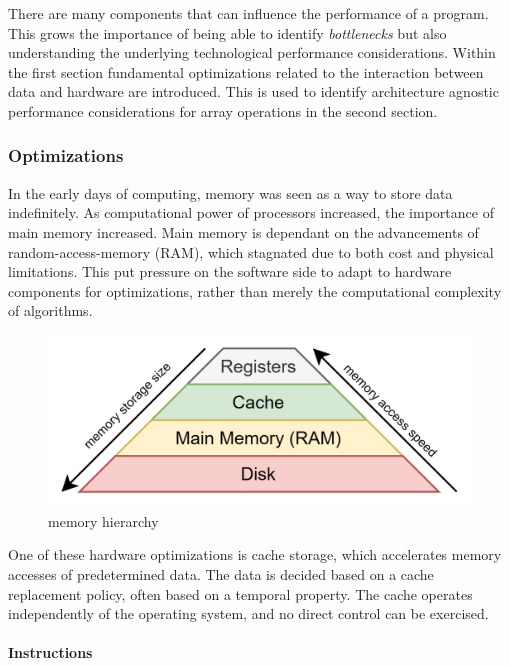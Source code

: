 \documentclass{article}
\begin{document}
There are many components that can influence the performance of a program.
This grows the importance of being able to identify {\it bottlenecks} but also understanding the underlying technological performance considerations\cite{programming-optimization}.
Within the first section fundamental optimizations related to the interaction between data and hardware are introduced.
This is used to identify architecture agnostic performance considerations for array operations in the second section.

\subsubsection{Optimizations}

In the early days of computing, memory was seen as a way to store data indefinitely.
As computational power of processors increased, the importance of main memory increased.
Main memory is dependant on the advancements of random-access-memory (RAM), which stagnated due to both cost and physical limitations\cite{memory}. 
This put pressure on the software side to adapt to hardware components for optimizations, rather than merely the computational complexity of algorithms.

\begin{figure}[ht]
    \centering
    \includegraphics[scale=0.2]{memoryhierarchy}
    \caption{ memory hierarchy }
\end{figure}

One of these hardware optimizations is cache storage, which accelerates memory accesses of predetermined data.
The data is decided based on a cache replacement policy, often based on a temporal property. 
The cache operates independently of the operating system\cite{memory}, and no direct control can be exercised.

\paragraph{Instructions}
\end{document}
